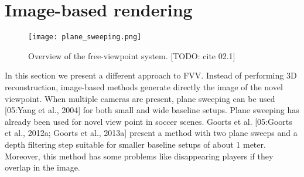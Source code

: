 \section{Image-based rendering}

\begin{figure}[htbp]
\centerline{\texttt{[image: plane\_sweeping.png]}}
\caption{Overview of the free-viewpoint system. [TODO: cite 02.1]}
\label{fig:plane_sweeping}
\end{figure}

In this section we present a different approach to FVV.
Instead of performing 3D reconstruction, image-based methods generate directly the image of the novel viewpoint.
When multiple cameras are present, plane sweeping can be used [05:Yang et al., 2004] for both small and wide 
baseline setups.
Plane sweeping has already been used for novel view point in soccer scenes. Goorts et al. [05:Goorts
et al., 2012a; Goorts et al., 2013a] present a method
with two plane sweeps and a depth filtering step suitable for smaller baseline 
setups of about 1 meter. 
Moreover, this method has some problems like disappearing players
if they overlap in the image.

